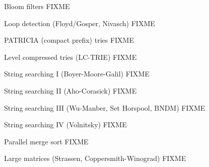 \documentclass[mathserif,xcolor={dvipsnames,table}]{beamer}
\begin{document}
\begin{frame}{Bloom filters}
\huge FIXME
\end{frame}

\begin{frame}{Loop detection (Floyd/Gosper, Nivasch)}
\huge FIXME
\end{frame}

\begin{frame}{PATRICIA (compact prefix) tries}
\huge FIXME
\end{frame}

\begin{frame}{Level compressed tries (LC-TRIE)}
\huge FIXME
\end{frame}

\begin{frame}{String searching I (Boyer-Moore-Galil)}
\huge FIXME
\end{frame}

\begin{frame}{String searching II (Aho-Corasick)}
\huge FIXME
\end{frame}

\begin{frame}{String searching III (Wu-Manber, Set Horspool, BNDM)}
\huge FIXME
\end{frame}

\begin{frame}{String searching IV (Volnitsky)}
\huge FIXME
\end{frame}

\begin{frame}{Parallel merge sort}
\huge FIXME
\end{frame}

\begin{frame}{Large matrices (Strassen, Coppersmith-Winograd)}
\huge FIXME
\end{frame}
\end{document}
